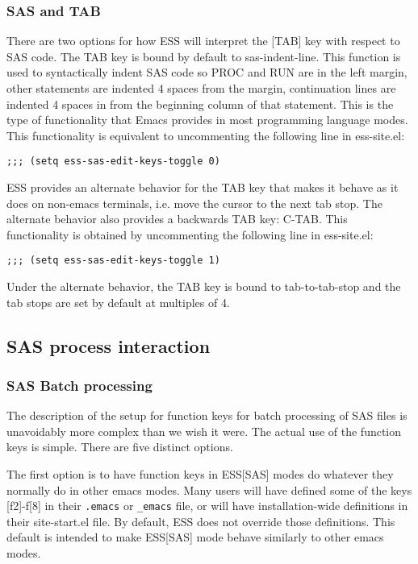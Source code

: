 \documentclass{article}
\begin{document}
\subsubsection{SAS and TAB}
\label{sec:SAS:tab}

There are two options for how ESS will interpret the [TAB] key with
respect to SAS code.  The TAB key is bound by default to
sas-indent-line.  This function is used to syntactically indent SAS
code so PROC and RUN are in the left margin, other statements are
indented 4 spaces from the margin, continuation lines are indented 4
spaces in from the beginning column of that statement.  This is the
type of functionality that Emacs provides in most programming language
modes.  This functionality is equivalent to uncommenting the following
line in ess-site.el:
\begin{verbatim}
;;; (setq ess-sas-edit-keys-toggle 0)
\end{verbatim}

ESS provides an alternate behavior for the TAB key that makes it
behave as it does on non-emacs terminals, i.e. move the cursor to the
next tab stop.  The alternate behavior also provides a backwards TAB
key: C-TAB.  This functionality is obtained by uncommenting the
following line in ess-site.el:
\begin{verbatim}
;;; (setq ess-sas-edit-keys-toggle 1)
\end{verbatim}
Under the alternate behavior, the TAB key is bound to tab-to-tab-stop
and the tab stops are set by default at multiples of 4.


\subsection{SAS process interaction}
\label{sec:SAS:proc}


\subsubsection{SAS Batch processing}
\label{sec:SAS:proc:batch}

The description of the setup for function keys for batch processing of
SAS files is unavoidably more complex than we wish it were.  The actual
use of the function keys is simple.  There are five distinct options.

The first option is to have function keys in ESS[SAS] modes do
whatever they normally do in other emacs modes.  Many users will have
defined some of the keys [f2]-f[8] in their \verb+.emacs+ or
\verb|_emacs| file, or will have installation-wide definitions in
their site-start.el file.  By default, ESS does not override those
definitions.  This default is intended to make ESS[SAS] mode behave
similarly to other emacs modes.
\end{document}
